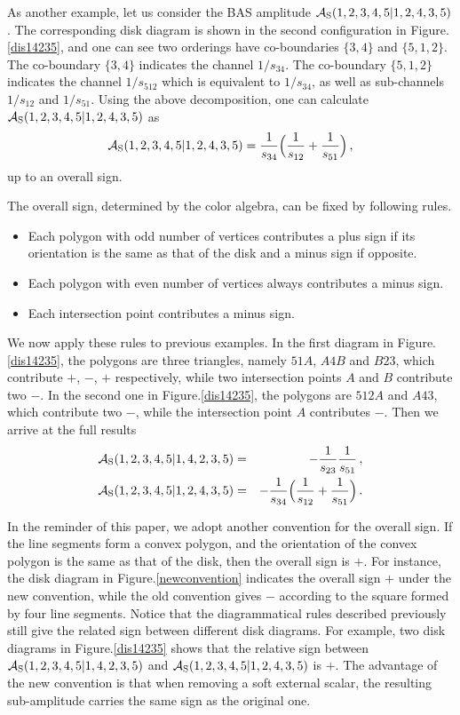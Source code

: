 \documentclass[11pt,a4paper]{article}
\newcommand{\bea}{\begin{eqnarray}}
\newcommand{\eea}{\end{eqnarray}}
\newcommand{\nn}{\nonumber \\}
\begin{document}
As another example, let us consider the BAS amplitude ${\cal A}_{\rm S}(1,2,3,4,5|1,2,4,3,5)$. The corresponding disk diagram is shown in the second configuration in
Figure.\ref{dis14235}, and one can see two orderings have co-boundaries $\{3,4\}$ and $\{5,1,2\}$. The co-boundary $\{3,4\}$ indicates the channel ${1/ s_{34}}$. The co-boundary $\{5,1,2\}$ indicates the channel ${1/s_{512}}$ which is equivalent to $1/s_{34}$, as well as sub-channels ${1/ s_{12}}$ and ${1/ s_{51}}$. Using the above decomposition, one can calculate ${\cal A}_{\rm S}(1,2,3,4,5|1,2,4,3,5)$ as
%
\bea
{\cal A}_{\rm S}(1,2,3,4,5|1,2,4,3,5)={1\over s_{34}}\Big({1\over s_{12}}+{1\over s_{51}}\Big)\,,
\eea
%
up to an overall sign.


The overall sign, determined by the color algebra, can be fixed by following rules.
%
\begin{itemize}
\item Each polygon with odd number of vertices contributes
a plus sign if its orientation is the same as that of the disk and a minus sign if opposite.
\item Each polygon with even number of vertices always contributes a minus sign.
\item Each intersection point contributes a minus sign.
\end{itemize}
%
We now apply these rules to previous examples. In the first diagram in Figure.\ref{dis14235}, the polygons are three triangles, namely $51A$, $A4B$ and $B23$, which contribute $+$, $-$, $+$ respectively, while two intersection points $A$ and $B$ contribute two $-$. In the second one in Figure.\ref{dis14235}, the polygons are $512A$ and $A43$, which contribute two $-$, while the intersection point $A$ contributes $-$. Then we arrive at the full results
%
\bea
{\cal A}_{\rm S}(1,2,3,4,5|1,4,2,3,5)&=&-{1\over s_{23}}{1\over s_{51}}\,,\nn
{\cal A}_{\rm S}(1,2,3,4,5|1,2,4,3,5)&=&-{1\over s_{34}}\Big({1\over s_{12}}+{1\over s_{51}}\Big)\,.
\eea


In the reminder of this paper, we adopt another convention for the overall sign. If the line segments form a convex polygon, and the orientation of the convex polygon is the same as that of the disk, then the overall sign is $+$. For instance, the disk diagram in Figure.\ref{newconvention} indicates the overall sign $+$ under the new convention, while the old convention gives $-$ according to the square formed by four line segments. Notice that the diagrammatical rules described previously still give the related sign between different disk diagrams. For example, two disk diagrams in Figure.\ref{dis14235} shows that the relative sign between ${\cal A}_{\rm S}(1,2,3,4,5|1,4,2,3,5)$ and
${\cal A}_{\rm S}(1,2,3,4,5|1,2,4,3,5)$ is $+$. The advantage of the new convention is that when removing a soft external scalar, the resulting sub-amplitude carries the same sign as the original one.
\end{document}
